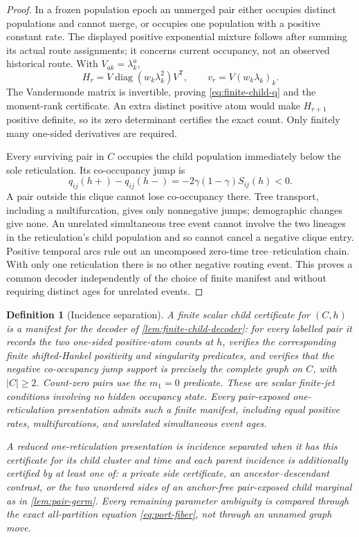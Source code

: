 \documentclass[11pt]{article}
\newtheorem{definition}[theorem]{Definition}
\begin{document}
\begin{proof}
In a frozen population epoch an unmerged pair either occupies distinct populations and cannot merge, or occupies one population with a positive constant rate.  The displayed positive exponential mixture follows after summing its actual route assignments; it concerns current occupancy, not an observed historical route.  With $V_{ak}=\lambda_k^a$,
\[
H_r=V\operatorname{diag}(w_k\lambda_k^2)V^{\mathsf T},\qquad
v_r=V(w_k\lambda_k)_k.
\]
The Vandermonde matrix is invertible, proving \eqref{eq:finite-child-q} and the moment-rank certificate.  An extra distinct positive atom would make $H_{r+1}$ positive definite, so its zero determinant certifies the exact count.  Only finitely many one-sided derivatives are required.

Every surviving pair in $C$ occupies the child population immediately below the sole reticulation.  Its co-occupancy jump is
\[
q_{ij}(h+)-q_{ij}(h-)
=-2\gamma(1-\gamma)S_{ij}(h)<0.
\]
A pair outside this clique cannot lose co-occupancy there.  Tree transport, including a multifurcation, gives only nonnegative jumps; demographic changes give none.  An unrelated simultaneous tree event cannot involve the two lineages in the reticulation's child population and so cannot cancel a negative clique entry.  Positive temporal arcs rule out an uncomposed zero-time tree--reticulation chain.  With only one reticulation there is no other negative routing event.  This proves a common decoder independently of the choice of finite manifest and without requiring distinct ages for unrelated events.
\end{proof}

\begin{definition}[Incidence separation]
\label{def:incidence-separated}
A \emph{finite scalar child certificate} for $(C,h)$ is a manifest for the decoder of \cref{lem:finite-child-decoder}: for every labelled pair it records the two one-sided positive-atom counts at $h$, verifies the corresponding finite shifted-Hankel positivity and singularity predicates, and verifies that the negative co-occupancy jump support is precisely the complete graph on $C$, with $|C|\ge2$.  Count-zero pairs use the $m_1=0$ predicate.  These are scalar finite-jet conditions involving no hidden occupancy state.  Every pair-exposed one-reticulation presentation admits such a finite manifest, including equal positive rates, multifurcations, and unrelated simultaneous event ages.

A reduced one-reticulation presentation is \emph{incidence separated} when it has this certificate for its child cluster and time and each parent incidence is additionally certified by at least one of: a private side certificate, an ancestor--descendant contrast, or the two unordered sides of an anchor-free pair-exposed child marginal as in \cref{lem:pair-germ}.  Every remaining parameter ambiguity is compared through the exact all-partition equation \eqref{eq:port-fiber}, not through an unnamed graph move.
\end{definition}
\end{document}
